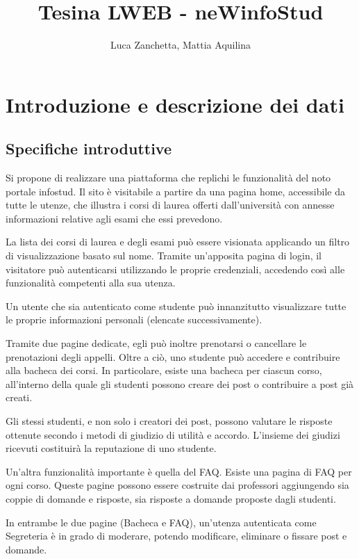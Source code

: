 \documentclass [a4paper,11pt]{book}
\begin{document}
\author{Luca Zanchetta, Mattia Aquilina}
\title{Tesina LWEB - neWinfoStud}
\maketitle

\tableofcontents

\chapter{Introduzione e descrizione dei dati}

\section{Specifiche introduttive}

Si propone di realizzare una piattaforma che replichi le funzionalità del noto portale infostud. Il sito è visitabile a partire da una pagina home, accessibile da tutte le utenze, che illustra i corsi di laurea offerti dall’università con annesse informazioni relative agli esami che essi prevedono.
  
La lista dei corsi di laurea e degli esami può essere visionata applicando un filtro di visualizzazione basato sul nome.
Tramite un’apposita pagina di login, il visitatore può autenticarsi utilizzando le proprie credenziali, accedendo così alle funzionalità competenti alla sua utenza.

Un utente che sia autenticato come studente può innanzitutto visualizzare tutte le proprie informazioni personali (elencate successivamente). 

Tramite due pagine dedicate, egli può inoltre prenotarsi o cancellare le prenotazioni degli appelli. Oltre a ciò, uno studente può accedere e contribuire alla bacheca dei corsi. In particolare, esiste una bacheca per ciascun corso, all’interno della quale gli studenti possono creare dei post o contribuire a post già creati. 

Gli stessi studenti, e non solo i creatori dei post, possono valutare le risposte ottenute secondo i metodi di giudizio di utilità e accordo. L’insieme dei giudizi ricevuti costituirà la reputazione di uno studente.

Un’altra funzionalità importante è quella del FAQ. Esiste una pagina di FAQ per ogni corso. Queste pagine possono essere costruite dai professori aggiungendo sia coppie di domande e risposte, sia risposte a domande proposte dagli studenti.

In entrambe le due pagine (Bacheca e FAQ), un’utenza autenticata come Segreteria è in grado di moderare, potendo modificare, eliminare o fissare post e domande.
\end{document}
